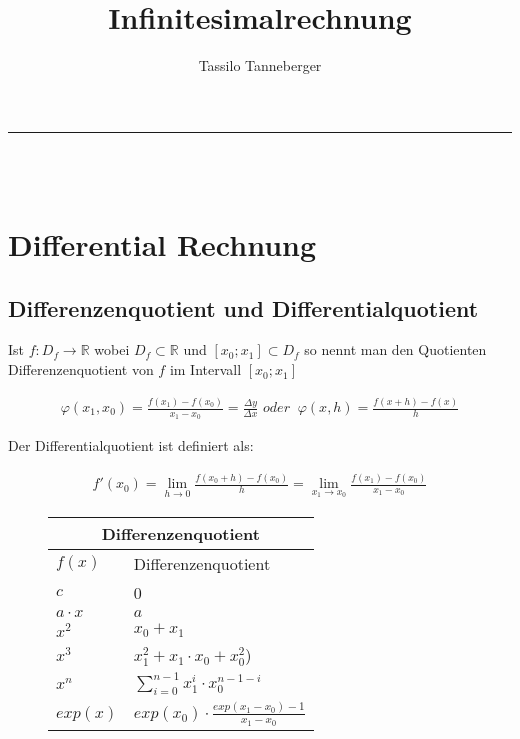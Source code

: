 \documentclass[12pt]{article}
\title{Infinitesimalrechnung}
\author{Tassilo Tanneberger}
\makeatletter
\newcommand{\linia}{\rule{\linewidth}{0.5pt}}
\renewcommand{\maketitle}{\begin{center}
\huge \@title\end{center}
\linia\\
{\large\@author\hfill\@date\\}}
\makeatother
\begin{document}
\maketitle

\section{Differential Rechnung}

\subsection{ Differenzenquotient und Differentialquotient}

Ist \( f: D_f \rightarrow \mathbb{R} \) wobei \( D_f \subset \mathbb{R} \) und \( [x_0; x_1] \subset D_f \) so nennt man den Quotienten Differenzenquotient von \( f \) im Intervall \( [x_0; x_1] \)

\begin{align*}
	\varphi (x_1, x_0) = \frac{f(x_1) - f(x_0)}{x_1 - x_0} = \frac{\Delta y}{\Delta x} \textit{ oder } \ \varphi(x, h) = \frac{f(x + h) - f(x)}{h}
\end{align*}

Der Differentialquotient ist definiert als:

\begin{align*}
	f' (x_0) = \lim_{h \rightarrow 0} \frac{f(x_0 + h) - f(x_0) }{h} = \lim_{x_1 \rightarrow x_0} \frac{f(x_1) - f(x_0)}{x_1 - x_0}
\end{align*}

\begin{figure}[h]


\begin{tabular}{ |p{2cm}| p{10cm}| }
 \hline
 \multicolumn{2}{|c|}{Differenzenquotient} \\
 \hline
\( f(x) \) & Differenzenquotient \\
 \hline
  \( c \) & 0\\
  \( a \cdot x \) & \( a \)  \\
  \( x^2 \) & \( x_0 + x_1 \)  \\
  \( x^3\) & \( x_1^2 + x_1 \cdot x_0 + x_0^2 \)) \\
  \( x^n \) & \( \sum_{ i = 0} ^ {n - 1} x_1^i \cdot x_0^{n - 1 -i} \) \\
  \( exp(x) \) & \( exp(x_0) \cdot \frac{exp(x_1 - x_0) - 1}{x_1 - x_0} \)\\

 \hline
\end{tabular} 
\centering
\end{figure}
\end{document}
